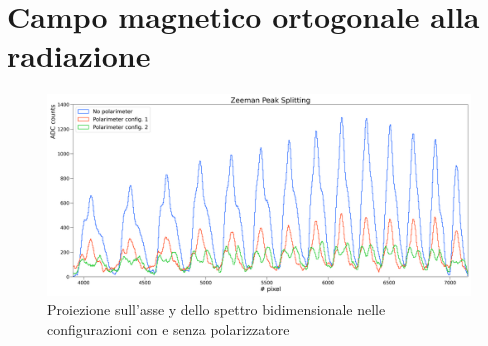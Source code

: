 \documentclass[twocolumn,10pt]{asme2ej}
\begin{document}







\cleardoublepage
\section{Campo magnetico ortogonale alla radiazione}\label{s:ortogonale}

\begin{figure}
    \centering
    \includegraphics[width=\textwidth]{../Plots/Bon_overlap_big.png}
    \caption{Proiezione sull'asse y dello spettro bidimensionale nelle configurazioni con e senza polarizzatore}
    \label{i:spettro2d_overlap}
\end{figure}

\end{document}
